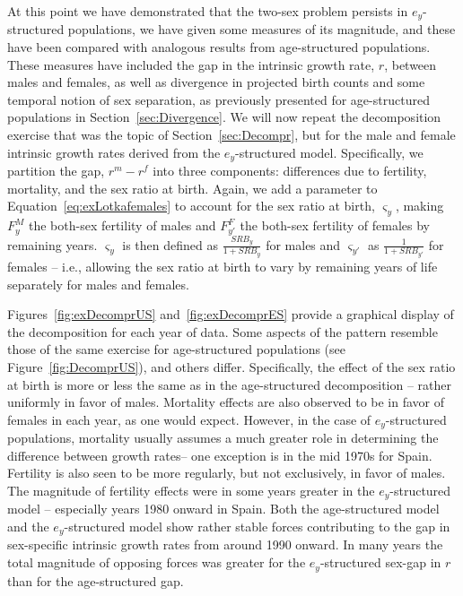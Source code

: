  \FloatBarrier
 \label{sec:exdecomposer}
At this point we have demonstrated that the two-sex problem persists in
$e_y$-structured populations, we have given some measures of its
magnitude, and these have been compared with analogous results from
age-structured populations. These measures have included the gap in the
intrinsic growth rate, $r$, between males and females, as well as
divergence in projected birth counts and some
temporal notion of sex separation, as previously
presented for age-structured populations in Section~\ref{sec:Divergence}. We
will now repeat the decomposition exercise that was the topic of
 Section~\ref{sec:Decompr}, but for the male and female intrinsic growth rates 
 derived from the $e_y$-structured model. Specifically, we partition the 
 gap, $r^m-r^f$ into three components: differences due to fertility, 
 mortality, and the sex ratio at birth. Again, we add a parameter to
 Equation~\eqref{eq:exLotkafemales} to account for the sex ratio at 
 birth, $\varsigma _{y}$, making $F_{y}^M$
the both-sex fertility of males and $F_{y'}^F$ the both-sex fertility of females
by remaining years. $\varsigma _{y}$ is then defined as $\frac{SRB_y}{1+SRB_y}$
for males and $\varsigma _{y'}$ as $\frac{1}{1+SRB_{y'}}$ for females -- i.e.,
allowing the sex ratio at birth to vary by remaining years of life separately 
for males and females.

Figures~\ref{fig:exDecomprUS} and~\ref{fig:exDecomprES} provide a graphical
display of the decomposition for each year of data. Some
aspects of the pattern resemble those of the same exercise for age-structured 
populations (see Figure~\ref{fig:DecomprUS}), and others differ.
Specifically, the effect of the sex ratio at birth is more or less the same as
in the age-structured decomposition -- rather uniformly in favor of males.
Mortality effects are also observed to be in favor of females in each year, as
one would expect. However, in the case of $e_y$-structured populations,
mortality usually assumes a much greater role in determining the difference between growth
rates-- one exception is in the mid 1970s for Spain. Fertility is also seen to
be more regularly, but not exclusively, in favor of males. The magnitude of
fertility effects were in some years greater in the $e_y$-structured model --
especially years 1980 onward in Spain. Both the age-structured model and the
$e_y$-structured model show rather stable forces contributing to the gap in
sex-specific intrinsic growth rates from around 1990 onward. In many years the
total magnitude of opposing forces was greater for the $e_y$-structured sex-gap
in $r$ than for the age-structured gap.


